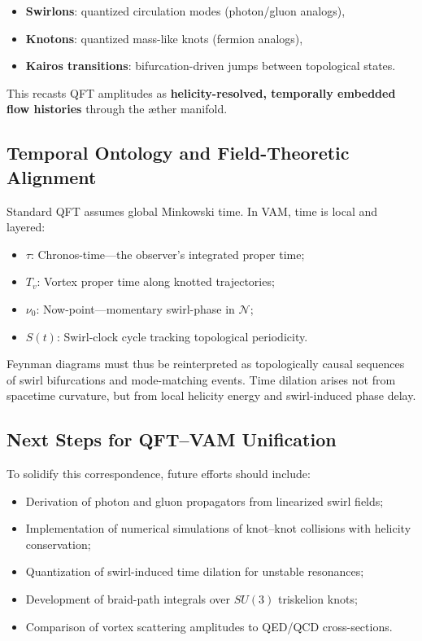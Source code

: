 \documentclass[12pt]{article}
\begin{document}
\begin{itemize}
    \item \textbf{Swirlons}: quantized circulation modes (photon/gluon analogs),
    \item \textbf{Knotons}: quantized mass-like knots (fermion analogs),
    \item \textbf{Kairos transitions}: bifurcation-driven jumps between topological states.
\end{itemize}

This recasts QFT amplitudes as \textbf{helicity-resolved, temporally embedded flow histories} through the æther manifold.

\subsection{Temporal Ontology and Field-Theoretic Alignment}

Standard QFT assumes global Minkowski time. In VAM, time is local and layered:

\begin{itemize}
    \item \( \tau \): Chronos-time—the observer’s integrated proper time;
    \item \( T_v \): Vortex proper time along knotted trajectories;
    \item \( \nu_0 \): Now-point—momentary swirl-phase in \( \mathcal{N} \);
    \item \( S(t) \): Swirl-clock cycle tracking topological periodicity.
\end{itemize}

Feynman diagrams must thus be reinterpreted as topologically causal sequences of swirl bifurcations and mode-matching events. Time dilation arises not from spacetime curvature, but from local helicity energy and swirl-induced phase delay.

\subsection{Next Steps for QFT--VAM Unification}

To solidify this correspondence, future efforts should include:

\begin{itemize}
    \item Derivation of photon and gluon propagators from linearized swirl fields;
    \item Implementation of numerical simulations of knot–knot collisions with helicity conservation;
    \item Quantization of swirl-induced time dilation for unstable resonances;
    \item Development of braid-path integrals over \( SU(3) \) triskelion knots;
    \item Comparison of vortex scattering amplitudes to QED/QCD cross-sections.
\end{itemize}
\end{document}
